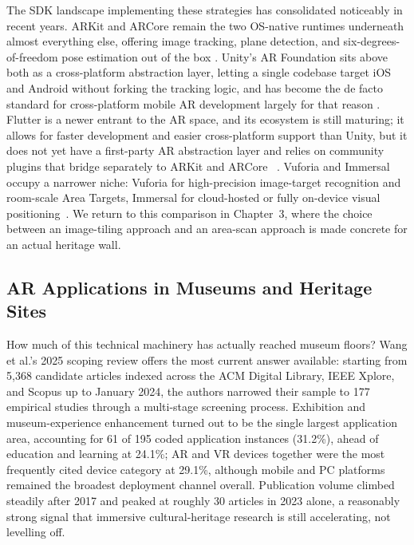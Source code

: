 The SDK landscape implementing these strategies has consolidated
noticeably in recent years. ARKit and ARCore remain the two OS-native
runtimes underneath almost everything else, offering image tracking,
plane detection, and six-degrees-of-freedom pose estimation out of the
box \cite{wangzhu2022}. Unity's AR Foundation sits above both as a
cross-platform abstraction layer, letting a single codebase target iOS
and Android without forking the tracking logic, and has become the de
facto standard for cross-platform mobile AR development largely for that
reason \cite{wangzhu2022}. Flutter is a newer entrant to the AR space, and its ecosystem is still maturing; it allows for faster development and easier cross-platform support than Unity, but it does not yet have a first-party AR abstraction layer and relies on community plugins that bridge separately to ARKit and ARCore ~\cite{arflutterplugin2026}.
Vuforia and Immersal occupy a narrower niche:
Vuforia for high-precision image-target recognition and room-scale Area
Targets, Immersal for cloud-hosted or fully
on-device visual positioning~\cite{immersal2026faq}.
We return to this comparison in Chapter~3, where the choice between an image-tiling
approach and an area-scan approach is made concrete for an actual
heritage wall.

\subsection{AR Applications in Museums and Heritage Sites}
\label{subsec:rw-ar-museum-apps}

How much of this technical machinery has actually reached museum floors?
Wang et al.'s 2025 scoping review \cite{wang2025grand} offers the most
current answer available: starting from 5{,}368 candidate articles
indexed across the ACM Digital Library, IEEE Xplore, and Scopus up to
January 2024, the authors narrowed their sample to 177 empirical studies
through a multi-stage screening process. Exhibition and museum-experience
enhancement turned out to be the single largest application area,
accounting for 61 of 195 coded application instances (31.2\%), ahead of
education and learning at 24.1\%; AR and VR devices together were the
most frequently cited device category at 29.1\%, although mobile and PC
platforms remained the broadest deployment channel overall. Publication
volume climbed steadily after 2017 and peaked at roughly 30 articles in
2023 alone, a reasonably strong signal that immersive cultural-heritage
research is still accelerating, not levelling off.

